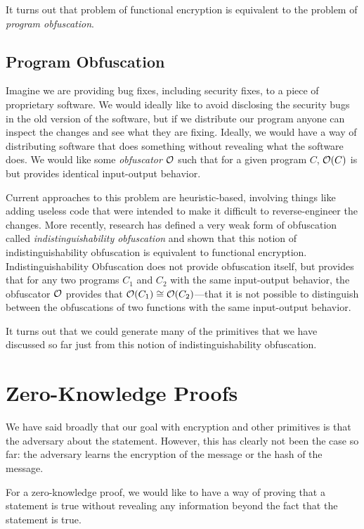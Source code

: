 It turns out that problem of functional encryption is equivalent to the problem of \emph{program obfuscation}.
\subsection{Program Obfuscation}
Imagine we are providing bug fixes, including security fixes, to a piece of proprietary software. We would ideally like to avoid disclosing the security bugs in the old version of the software, but if we distribute our program anyone can inspect the changes and see what they are fixing. Ideally, we would have a way of distributing software that does something without revealing what the software does. We would like some \emph{obfuscator} $\mathcal{O}$ such that for a given program $C$, $\mathcal{O}(C)$ is  but provides identical input-output behavior.

Current approaches to this problem are heuristic-based, involving things like adding useless code that were intended to make it difficult to reverse-engineer the changes. More recently, research has defined a very weak form of obfuscation called \emph{indistinguishability obfuscation} and shown that this notion of indistinguishability obfuscation is equivalent to functional encryption. Indistinguishability Obfuscation does not provide obfuscation itself, but provides that for any two programs $C_1$ and $C_2$ with the same input-output behavior, the obfuscator $\mathcal{O}$ provides that $\mathcal{O}(C_1) \cong \mathcal{O}(C_2)$---that it is not possible to distinguish between the obfuscations of two functions with the same input-output behavior.

It turns out that we could generate many of the primitives that we have discussed so far just from this notion of indistinguishability obfuscation.


\section{Zero-Knowledge Proofs}
We have said broadly that our goal with encryption and other primitives is that the adversary  about the statement. However, this has clearly not been the case so far: the adversary learns the encryption of the message or the hash of the message. 

For a zero-knowledge proof, we would like to have a way of proving that a statement is true without revealing any information beyond the fact that the statement is true.

